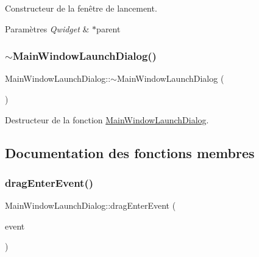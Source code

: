 Constructeur de la fenêtre de lancement. 


\begin{DoxyParams}{Paramètres}
{\em Qwidget} & $\ast$parent \\
\hline
\end{DoxyParams}
\mbox{\label{classMainWindowLaunchDialog_abf8a63fe899ba6d8fcbdf179122dfcb7}} 
\subsubsection{\texorpdfstring{$\sim$\+Main\+Window\+Launch\+Dialog()}{~MainWindowLaunchDialog()}}
{\footnotesize\ttfamily Main\+Window\+Launch\+Dialog\+::$\sim$\+Main\+Window\+Launch\+Dialog (\begin{DoxyParamCaption}{ }\end{DoxyParamCaption})}



Destructeur de la fonction \hyperlink{classMainWindowLaunchDialog}{Main\+Window\+Launch\+Dialog}. 



\subsection{Documentation des fonctions membres}
\mbox{\label{classMainWindowLaunchDialog_aaf393173ffd6c63b2c4d5bdd48b8ddb4}} 
\subsubsection{\texorpdfstring{drag\+Enter\+Event()}{dragEnterEvent()}}
{\footnotesize\ttfamily Main\+Window\+Launch\+Dialog\+::drag\+Enter\+Event (\begin{DoxyParamCaption}\item[{Q\+Drag\+Enter\+Event $\ast$}]{event }\end{DoxyParamCaption})\hspace{0.3cm}{\ttfamily [private]}}



